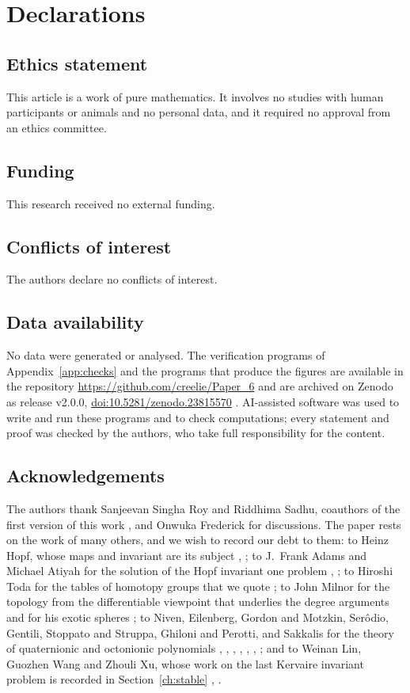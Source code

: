 \section*{Declarations}

\subsection*{Ethics statement}
This article is a work of pure mathematics. It involves no studies with human participants or animals and no personal data, and it required no approval from an ethics committee.

\subsection*{Funding}
This research received no external funding.

\subsection*{Conflicts of interest}
The authors declare no conflicts of interest.

\subsection*{Data availability}
No data were generated or analysed. The verification programs of Appendix~\ref{app:checks} and the programs that produce the figures are available in the repository \url{https://github.com/creelie/Paper_6} and are archived on Zenodo as release v2.0.0, \href{https://doi.org/10.5281/zenodo.23815570}{doi:10.5281/zenodo.23815570} \cite{BB26}. AI-assisted software was used to write and run these programs and to check computations; every statement and proof was checked by the authors, who take full responsibility for the content.

\subsection*{Acknowledgements}
The authors thank Sanjeevan Singha Roy and Riddhima Sadhu, coauthors of the first version of this work \cite{BSS22}, and Onwuka Frederick for discussions. The paper rests on the work of many others, and we wish to record our debt to them: to Heinz Hopf, whose maps and invariant are its subject \cite{Hop31}, \cite{Hop35}; to J.~Frank Adams and Michael Atiyah for the solution of the Hopf invariant one problem \cite{Ada60}, \cite{AA66}; to Hiroshi Toda for the tables of homotopy groups that we quote \cite{Tod62}; to John Milnor for the topology from the differentiable viewpoint that underlies the degree arguments \cite{Mil65} and for his exotic spheres \cite{Mil56}; to Niven, Eilenberg, Gordon and Motzkin, Ser\^odio, Gentili, Stoppato and Struppa, Ghiloni and Perotti, and Sakkalis for the theory of quaternionic and octonionic polynomials \cite{Niv41}, \cite{EN44}, \cite{GM65}, \cite{Ser07}, \cite{GSS13}, \cite{GP11}, \cite{Sak20}; and to Weinan Lin, Guozhen Wang and Zhouli Xu, whose work on the last Kervaire invariant problem is recorded in Section~\ref{ch:stable} \cite{LWX24}, \cite{LWX24b}.
